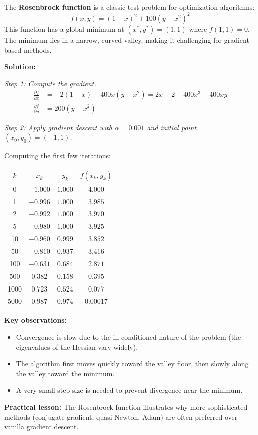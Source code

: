 \begin{examplebox}[title=Example: Gradient Descent on the Rosenbrock Function]
The \textbf{Rosenbrock function} is a classic test problem for optimization algorithms:
\begin{equation}
f(x, y) = (1 - x)^2 + 100(y - x^2)^2
\end{equation}
This function has a global minimum at $(x^*, y^*) = (1, 1)$ where $f(1, 1) = 0$. The minimum lies in a narrow, curved valley, making it challenging for gradient-based methods.

\textbf{Solution:}

\textit{Step 1: Compute the gradient.}
\begin{align}
\frac{\partial f}{\partial x} &= -2(1 - x) - 400x(y - x^2) = 2x - 2 + 400x^3 - 400xy \\
\frac{\partial f}{\partial y} &= 200(y - x^2)
\end{align}

\textit{Step 2: Apply gradient descent with $\alpha = 0.001$ and initial point $(x_0, y_0) = (-1, 1)$.}

Computing the first few iterations:
\begin{center}
\begin{tabular}{c|cc|c}
\toprule
$k$ & $x_k$ & $y_k$ & $f(x_k, y_k)$ \\
\midrule
0 & $-1.000$ & $1.000$ & $4.000$ \\
1 & $-0.996$ & $1.000$ & $3.985$ \\
2 & $-0.992$ & $1.000$ & $3.970$ \\
5 & $-0.980$ & $1.000$ & $3.925$ \\
10 & $-0.960$ & $0.999$ & $3.852$ \\
50 & $-0.810$ & $0.937$ & $3.416$ \\
100 & $-0.631$ & $0.684$ & $2.871$ \\
500 & $0.382$ & $0.158$ & $0.395$ \\
1000 & $0.723$ & $0.524$ & $0.077$ \\
5000 & $0.987$ & $0.974$ & $0.00017$ \\
\bottomrule
\end{tabular}
\end{center}

\textbf{Key observations:}
\begin{itemize}
    \item Convergence is slow due to the ill-conditioned nature of the problem (the eigenvalues of the Hessian vary widely).
    \item The algorithm first moves quickly toward the valley floor, then slowly along the valley toward the minimum.
    \item A very small step size is needed to prevent divergence near the minimum.
\end{itemize}

\textbf{Practical lesson:} The Rosenbrock function illustrates why more sophisticated methods (conjugate gradient, quasi-Newton, Adam) are often preferred over vanilla gradient descent.
\end{examplebox}

